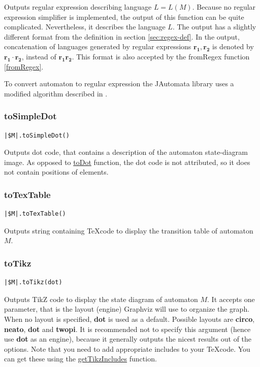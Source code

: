 \documentclass{ctuthesis}
\begin{document}
Outputs regular expression describing language $L = L(M)$. Because no regular expression simplifier is implemented, the output of this function can be quite complicated. Nevertheless, it describes the language $L$. The output has a slightly different format from the definition in section \ref{sec:regex-def}. In the output, concatenation of languages generated by regular expressions $\mathbf{r_1}, \mathbf{r_2}$ is denoted by $\mathbf{r_1}\cdot \mathbf{r_2}$, instead of $\mathbf{r_1r_2}$. This format is also accepted by the fromRegex function \ref{fromRegex}.

To convert automaton to regular expression the JAutomata library uses a modified algorithm described in \cite[p.98 algorithm 2.120]{melichar}.

\subsubsection{toSimpleDot}
\begin{lstlisting}[language = JASL_snippet]
	|$M|.toSimpleDot()
\end{lstlisting}

Outputs dot code, that contains a description of the automaton state-diagram image. As opposed to \hyperref[subsec:toDot]{toDot} function, the dot code is not attributed, so it does not contain positions of elements.

\subsubsection{toTexTable}
\begin{lstlisting}[language = JASL_snippet]
	|$M|.toTexTable()
\end{lstlisting}

Outputs string containing \TeX code to display the transition table of automaton $M$. 

\subsubsection{toTikz}
\label{to-tikz-conversion}
\begin{lstlisting}[language = JASL_snippet]
	|$M|.toTikz(dot)
\end{lstlisting}

Outputs TikZ code to display the state diagram of automaton $M$. It accepts one parameter, that is the layout (engine) Graphviz will use to organize the graph. When no layout is specified, \textbf{dot} is used as a default. Possible layouts are \textbf{circo}, \textbf{neato}, \textbf{dot} and \textbf{twopi}. It is recommended not to specify this argument (hence use \textbf{dot} as an engine), because it generally outputs the nicest results out of the options. Note that you need to add appropriate includes to your \TeX code. You can get these using the \hyperref[subsec:getTikzIncludes]{getTikzIncludes} function.
\end{document}
